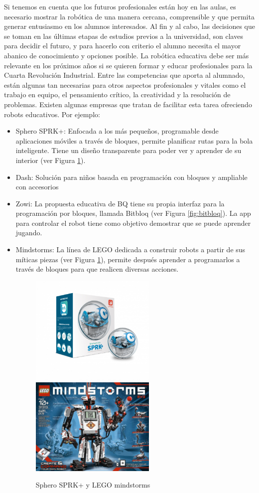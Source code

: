 \documentclass[12pt,spanish,chapterprefix, numbers=noenddot]{book}
\numberwithin{equation}{section}
\numberwithin{figure}{section}
\begin{document}
Si tenemos en cuenta que los futuros profesionales están hoy en las aulas, es necesario mostrar la robótica de una manera cercana, comprensible y que permita generar entusiasmo en los alumnos interesados. Al fin y al cabo, las decisiones que se toman en las últimas etapas de estudios previos a la universidad, son claves para decidir el futuro, y para hacerlo con criterio el alumno necesita el mayor abanico de conocimiento y opciones posible. 
La robótica educativa debe ser más relevante en los próximos años si se quieren formar y educar profesionales para la Cuarta Revolución Industrial. Entre las competencias que aporta al alumnado, están algunas tan necesarias para otros aspectos profesionales y vitales como el trabajo en equipo, el pensamiento crítico, la creatividad y la resolución de problemas. Existen algunas empresas que tratan de facilitar esta tarea ofreciendo robots educativos. Por ejemplo: 
\begin{itemize}
    \item Sphero SPRK+: Enfocada a los más pequeños, programable desde aplicaciones móviles a través de bloques, permite planificar rutas para la bola inteligente. Tiene un diseño transparente para poder ver y aprender de su interior (ver Figura \ref{fig:sphero}).  
    \item Dash: Solución para niños basada en programación con bloques y ampliable con accesorios 
    \item Zowi: La propuesta educativa de BQ tiene su propia interfaz para la programación por bloques, llamada Bitbloq (ver Figura \ref{fig:bitbloq}). La app para controlar el robot tiene como objetivo demostrar que se puede aprender jugando.
    \item Mindstorms: La línea de LEGO dedicada a construir robots a partir de sus míticas piezas (ver Figura \ref{fig:sphero}), permite después aprender a programarlos a través de bloques para que realicen diversas acciones. 
    \begin{figure}[h!]
    \centering
    \includegraphics[width=6cm]{Figs/spheroedu-sprkplus.png}
    \includegraphics[width=6cm]{Figs/mindstorms.jpg}
    \par
    \caption{\label{fig:sphero}Sphero SPRK+ y LEGO mindstorms}
    \end{figure}
\end{itemize}
\end{document}
